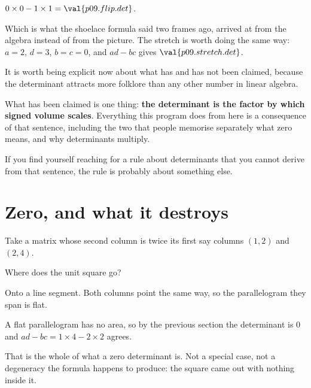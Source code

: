\begin{fr}
\begin{ansblock}
$0 \times 0 - 1 \times 1 = \val{p09.flip.det}$.
\end{ansblock}

Which is what the shoelace formula said two frames ago, arrived at from the
algebra instead of from the picture. The stretch is worth doing the same way:
$a = 2$, $d = 3$, $b = c = 0$, and $ad - bc$ gives $\val{p09.stretch.det}$.

It is worth being explicit now about what has and has not been claimed, because
the determinant attracts more folklore than any other number in linear algebra.

What has been claimed is one thing: \textbf{the determinant is the factor by
which signed volume scales}. Everything this program does from here is a
consequence of that sentence, including the two that people memorise
separately \dash{} what zero means, and why determinants multiply.

If you find yourself reaching for a rule about determinants that you cannot
derive from that sentence, the rule is probably about something else.
\end{fr}

\section{Zero, and what it destroys}
\label{sec:P09-zero}

\begin{fr}
Take a matrix whose second column is twice its first \dash{} say columns
$(1, 2)$ and $(2, 4)$.

Where does the unit square go?
\dotline
\nextframe
\end{fr}

\begin{fr}
\begin{ansblock}
Onto a line segment. Both columns point the same way, so the parallelogram they
span is flat.
\end{ansblock}

A flat parallelogram has no area, so by the previous section the determinant is
$0$ \dash{} and $ad - bc = 1 \times 4 - 2 \times 2$ agrees.

That is the whole of what a zero determinant is. Not a special case, not a
degeneracy the formula happens to produce: the square came out with nothing
inside it.
\end{fr}

